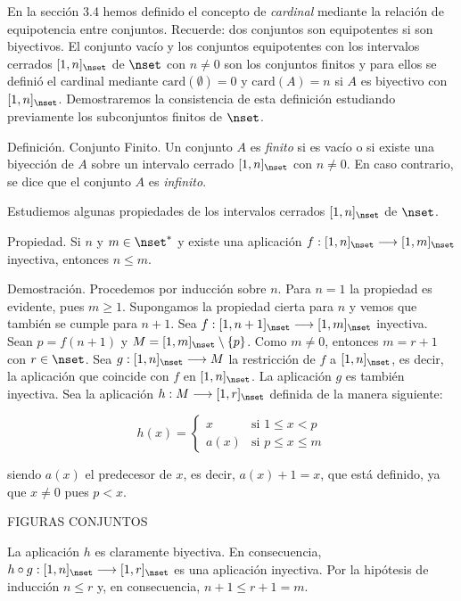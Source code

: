 


En la sección 3.4 hemos definido el concepto de \emph{cardinal} mediante la
relación de equipotencia entre conjuntos. Recuerde: dos conjuntos son
equipotentes si son biyectivos. El conjunto vacío y los conjuntos
equipotentes con los intervalos cerrados $[1, n]_{\nset}$ de $\nset$ con $n
\neq 0$ son los conjuntos finitos y para ellos se definió el cardinal
mediante $\text{card}(\emptyset) = 0$ y $\text{card}(A) = n$ si $A$ es
biyectivo con $[1, n]_{\nset}$. Demostraremos la consistencia de esta
definición estudiando previamente los subconjuntos finitos de $\nset$.

Definición. Conjunto Finito. Un conjunto $A$ es \emph{finito} si es vacío o
si existe una biyección de $A$ sobre un intervalo cerrado $[1, n]_{\nset}$
con $n \neq 0$. En caso contrario, se dice que el conjunto $A$ es
\emph{infinito}.

Estudiemos algunas propiedades de los intervalos cerrados $[1, n]_{\nset}$
de $\nset$.

Propiedad. Si $n$ y $m \in \nset^*$ y existe una aplicación $f: [1,
n]_{\nset} \longrightarrow [1, m]_{\nset}$ inyectiva, entonces $n \leq m$.

Demostración. Procedemos por inducción sobre $n$. Para $n = 1$ la propiedad
es evidente, pues $m \geq 1$. Supongamos la propiedad cierta para $n$ y
vemos que también se cumple para $n + 1$. Sea $f: [1, n + 1]_{\nset}
\longrightarrow [1, m]_{\nset}$ inyectiva. Sean $p = f(n + 1)$ y $M = [1,
m]_{\nset} \setminus \{p\}$. Como $m \neq 0$, entonces $m = r + 1$ con $r
\in \nset$. Sea $g: [1, n]_{\nset} \longrightarrow M$ la restricción de $f$
a $[1, n]_{\nset}$, es decir, la aplicación que coincide con $f$ en $[1,
n]_{\nset}$. La aplicación $g$ es también inyectiva. Sea la aplicación $h: M
\longrightarrow [1, r]_{\nset}$ definida de la manera siguiente:

$$
  h(x) =
  \begin{cases}
    x & \text{si } 1 \leq x < p \\
    a(x) & \text{si } p \leq x \leq m
  \end{cases}
$$

\noindent siendo $a(x)$ el predecesor de $x$, es decir, $a(x) + 1 = x$, que
está definido, ya que $x \neq 0$ pues $p < x$.

FIGURAS CONJUNTOS

La aplicación $h$ es claramente biyectiva. En consecuencia, $h \circ g: [1,
n]_{\nset} \longrightarrow [1, r]_{\nset}$ es una aplicación inyectiva. Por
la hipótesis de inducción $n \leq r$ y, en consecuencia, $n + 1 \leq r + 1 =
m$.

